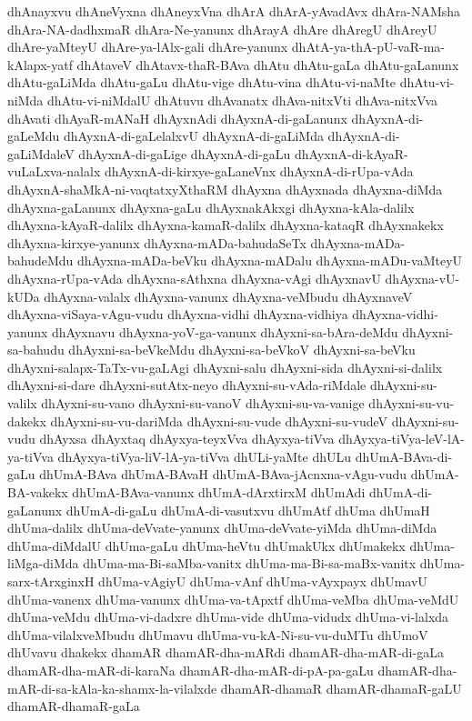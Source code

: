 {dhAnayxvu
dhAneVyxna
dhAneyxVna
dhArA
dhArA-yAvadAvx
dhAra-NAMsha
dhAra-NA-dadhxmaR
dhAra-Ne-yanunx
dhArayA
dhAre
dhAregU
dhAreyU
dhAre-yaMteyU
dhAre-ya-lAlx-gali
dhAre-yanunx
dhAtA-ya-thA-pU-vaR-ma-kAlapx-yatf
dhAtaveV
dhAtavx-thaR-BAva
dhAtu
dhAtu-gaLa
dhAtu-gaLanunx
dhAtu-gaLiMda
dhAtu-gaLu
dhAtu-vige
dhAtu-vina
dhAtu-vi-naMte
dhAtu-vi-niMda
dhAtu-vi-niMdalU
dhAtuvu
dhAvanatx
dhAva-nitxVti
dhAva-nitxVva
dhAvati
dhAyaR-mANaH
dhAyxnAdi
dhAyxnA-di-gaLanunx
dhAyxnA-di-gaLeMdu
dhAyxnA-di-gaLelalxvU
dhAyxnA-di-gaLiMda
dhAyxnA-di-gaLiMdaleV
dhAyxnA-di-gaLige
dhAyxnA-di-gaLu
dhAyxnA-di-kAyaR-vuLaLxva-nalalx
dhAyxnA-di-kirxye-gaLaneVnx
dhAyxnA-di-rUpa-vAda
dhAyxnA-shaMkA-ni-vaqtatxyXthaRM
dhAyxna
dhAyxnada
dhAyxna-diMda
dhAyxna-gaLanunx
dhAyxna-gaLu
dhAyxnakAkxgi
dhAyxna-kAla-dalilx
dhAyxna-kAyaR-dalilx
dhAyxna-kamaR-dalilx
dhAyxna-kataqR
dhAyxnakekx
dhAyxna-kirxye-yanunx
dhAyxna-mADa-bahudaSeTx
dhAyxna-mADa-bahudeMdu
dhAyxna-mADa-beVku
dhAyxna-mADalu
dhAyxna-mADu-vaMteyU
dhAyxna-rUpa-vAda
dhAyxna-sAthxna
dhAyxna-vAgi
dhAyxnavU
dhAyxna-vU-kUDa
dhAyxna-valalx
dhAyxna-vanunx
dhAyxna-veMbudu
dhAyxnaveV
dhAyxna-viSaya-vAgu-vudu
dhAyxna-vidhi
dhAyxna-vidhiya
dhAyxna-vidhi-yanunx
dhAyxnavu
dhAyxna-yoV-ga-vanunx
dhAyxni-sa-bAra-deMdu
dhAyxni-sa-bahudu
dhAyxni-sa-beVkeMdu
dhAyxni-sa-beVkoV
dhAyxni-sa-beVku
dhAyxni-salapx-TaTx-vu-gaLAgi
dhAyxni-salu
dhAyxni-sida
dhAyxni-si-dalilx
dhAyxni-si-dare
dhAyxni-sutAtx-neyo
dhAyxni-su-vAda-riMdale
dhAyxni-su-valilx
dhAyxni-su-vano
dhAyxni-su-vanoV
dhAyxni-su-va-vanige
dhAyxni-su-vu-dakekx
dhAyxni-su-vu-dariMda
dhAyxni-su-vude
dhAyxni-su-vudeV
dhAyxni-su-vudu
dhAyxsa
dhAyxtaq
dhAyxya-teyxVva
dhAyxya-tiVva
dhAyxya-tiVya-leV-lA-ya-tiVva
dhAyxya-tiVya-liV-lA-ya-tiVva
dhULi-yaMte
dhULu
dhUmA-BAva-di-gaLu
dhUmA-BAva
dhUmA-BAvaH
dhUmA-BAva-jAcnxna-vAgu-vudu
dhUmA-BA-vakekx
dhUmA-BAva-vanunx
dhUmA-dArxtirxM
dhUmAdi
dhUmA-di-gaLanunx
dhUmA-di-gaLu
dhUmA-di-vasutxvu
dhUmAtf
dhUma
dhUmaH
dhUma-dalilx
dhUma-deVvate-yanunx
dhUma-deVvate-yiMda
dhUma-diMda
dhUma-diMdalU
dhUma-gaLu
dhUma-heVtu
dhUmakUkx
dhUmakekx
dhUma-liMga-diMda
dhUma-ma-Bi-saMba-vanitx
dhUma-ma-Bi-sa-maBx-vanitx
dhUma-sarx-tArxginxH
dhUma-vAgiyU
dhUma-vAnf
dhUma-vAyxpayx
dhUmavU
dhUma-vanenx
dhUma-vanunx
dhUma-va-tApxtf
dhUma-veMba
dhUma-veMdU
dhUma-veMdu
dhUma-vi-dadxre
dhUma-vide
dhUma-vidudx
dhUma-vi-lalxda
dhUma-vilalxveMbudu
dhUmavu
dhUma-vu-kA-Ni-su-vu-duMTu
dhUmoV
dhUvavu
dhakekx
dhamAR
dhamAR-dha-mARdi
dhamAR-dha-mAR-di-gaLa
dhamAR-dha-mAR-di-karaNa
dhamAR-dha-mAR-di-pA-pa-gaLu
dhamAR-dha-mAR-di-sa-kAla-ka-shamx-la-vilalxde
dhamAR-dhamaR
dhamAR-dhamaR-gaLU
dhamAR-dhamaR-gaLa
}
